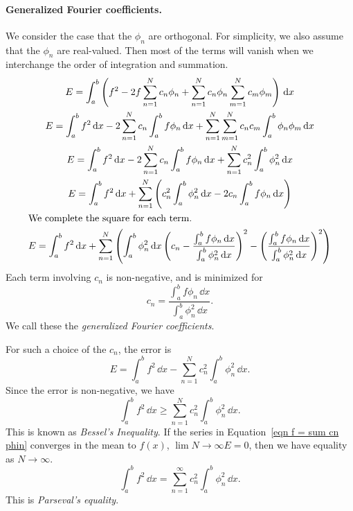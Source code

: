 \paragraph{Generalized Fourier coefficients.}
We consider the case that the $\phi_n$ are orthogonal.  
For simplicity, we also assume that the $\phi_n$ are real-valued.
Then most of the terms
will vanish when we interchange the order of integration and summation.
\begin{gather*}
  E = \int_a^b \left( f^2 - 2 f \sum_{n=1}^{N} c_n \phi_n 
    + \sum_{n=1}^{N} c_n \phi_n \sum_{m=1}^{N} c_m \phi_m \right)\,\mathrm{d} x
  \\
  E = \int_a^b f^2 \,\mathrm{d} x - 2 \sum_{n=1}^{N} c_n \int_a^b f \phi_n \,\mathrm{d} x
  + \sum_{n=1}^{N} \sum_{m=1}^{N} c_n c_m \int_a^b \phi_n \phi_m \,\mathrm{d} x
  \\
  E = \int_a^b f^2 \,\mathrm{d} x - 2 \sum_{n=1}^{N} c_n \int_a^b f \phi_n \,\mathrm{d} x
  + \sum_{n=1}^{N} c_n^2 \int_a^b \phi_n^2 \,\mathrm{d} x
  \\
  E = \int_a^b f^2 \,\mathrm{d} x 
  + \sum_{n=1}^{N} \left( c_n^2 \int_a^b \phi_n^2 \,\mathrm{d} x - 2 c_n \int_a^b f \phi_n \,\mathrm{d} x \right)
  \\
  \intertext{We complete the square for each term.}
  E = \int_a^b f^2 \,\mathrm{d} x 
  + \sum_{n=1}^{N} \left( \int_a^b \phi_n^2 \,\mathrm{d} x \left( c_n 
      - \frac{ \int_a^b f \phi_n \,\mathrm{d} x}{\int_a^b \phi_n^2 \,\mathrm{d} x } \right)^2
    - \left( \frac{ \int_a^b f \phi_n \,\mathrm{d} x}{\int_a^b \phi_n^2 \,\mathrm{d} x } \right)^2 \right)
\end{gather*}
Each term involving $c_n$ is non-negative, and is minimized for
\begin{equation}
  \label{eqn cn = frac int f phi int phi2}
  c_n = \frac{ \int_a^b f \phi_n \,\dd x}{\int_a^b \phi_n^2 \,\dd x }.
\end{equation}
We call these the \textit{generalized Fourier coefficients}.

For such a choice of the $c_n$, the error is
\[
E = \int_a^b f^2 \,\dd x - \sum_{n=1}^{N} c_n^2 \int_a^b \phi_n^2 \,\dd x.
\]
Since the error is non-negative, we have
\[
\int_a^b f^2 \,\dd x \geq \sum_{n=1}^{N} c_n^2 \int_a^b \phi_n^2 \,\dd x.
\]
This is known as \textit{Bessel's Inequality}.
If the series in Equation~\ref{eqn f = sum cn phin} converges in the mean
to $f(x)$, $\lim{N \to \infty} E = 0$, then we have equality as $N \to \infty$.
\[
\int_a^b f^2 \,\dd x = \sum_{n=1}^\infty c_n^2 \int_a^b \phi_n^2 \,\dd x.
\]
This is \textit{Parseval's equality}.




